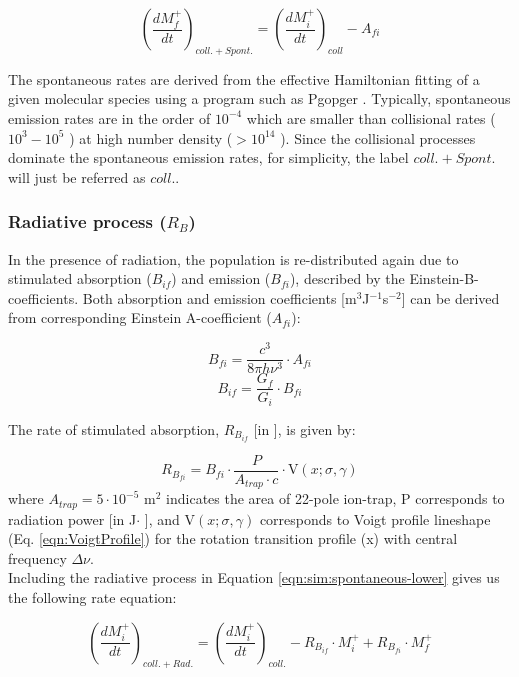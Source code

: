 \begin{equation}
    \left( \frac{dM^+_f}{dt} \right) _{coll. + Spont.} = \left( \frac{dM^+_i}{dt} \right) _{coll} - A_{fi}
    \label{eqn:sim:spontaneous-upper}
\end{equation}

The spontaneous rates are derived from the effective Hamiltonian fitting of a given molecular species using a program such as Pgopger \cite{western_pgopher_2017}. Typically, spontaneous emission rates are in the order of  $10^{-4}$ \pers which are smaller than collisional rates ($10^{3}-10^{5}$ \pers) at high number density ($>10^{14}$ \percc). Since the collisional processes dominate the spontaneous emission rates, for simplicity, the label $coll. + Spont.$ will just be referred as $coll.$.\\

\subsubsection{Radiative process (\texorpdfstring{$R_B$}{})}
\label{subsec:ROSAA-simulation-rad}

In the presence of radiation, the population is re-distributed again due to stimulated absorption ($B_{if}$) and emission ($B_{fi}$), described by the Einstein-B-coefficients. Both absorption and emission coefficients [m$^3$J$^{-1}$s$^{-2}$] can be derived from corresponding Einstein A-coefficient ($A_{fi}$):

\[ B_{fi} = \frac{c^3}{8\pi h \nu ^3} \cdot A_{fi} \]
\[ B_{if} = \frac{G_f}{G_i} \cdot B_{fi} \]

The rate of stimulated absorption, $R_{B_{if}}$ [in \pers], is given by:

\[ R_{B_{fi}} = B_{fi} \cdot \frac{P}{A_{trap} \cdot c} \cdot \text{V}(x;\sigma, \gamma) \]
where $A_{trap}=5 \cdot 10^{-5}$ m$^2$ indicates the area of 22-pole ion-trap, P corresponds to radiation power [in J$\cdot$ \pers], and $\text{V}(x;\sigma, \gamma)$ corresponds to Voigt profile lineshape (Eq. \ref{eqn:VoigtProfile}) for the rotation transition profile (x) with central frequency $\Delta \nu$.\\

Including the radiative process in Equation \ref{eqn:sim:spontaneous-lower} gives us the following rate equation:

\begin{equation}
    \left( \frac{dM^+_i}{dt} \right) _{coll. + Rad.} = \left( \frac{dM^+_i}{dt} \right) _{coll.}
     - R_{B_{if}} \cdot M^+_i + R_{B_{fi}} \cdot M^+_f
    \label{eqn:sim:radiative}
\end{equation}
\\

